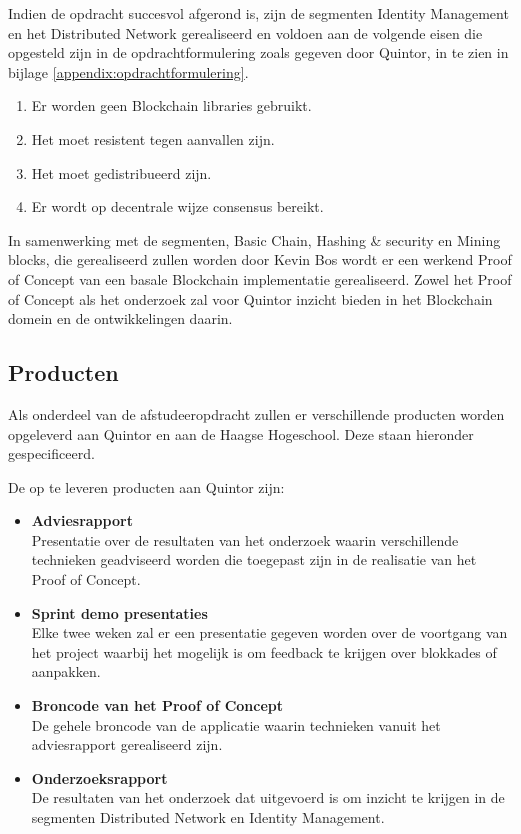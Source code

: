 Indien de opdracht succesvol afgerond is, zijn de segmenten Identity Management en het Distributed Network gerealiseerd en voldoen aan de volgende eisen die opgesteld zijn in de opdrachtformulering zoals gegeven door Quintor, in te zien in bijlage \ref{appendix:opdrachtformulering}.

\begin{enumerate}[noitemsep]
  \item Er worden geen Blockchain libraries gebruikt.
  \item Het moet resistent tegen aanvallen zijn.
  \item Het moet gedistribueerd zijn.
  \item Er wordt op decentrale wijze consensus bereikt.
\end{enumerate}

In samenwerking met de segmenten, Basic Chain, Hashing \& security en Mining blocks, die gerealiseerd zullen worden door Kevin Bos wordt er een werkend Proof of Concept van een basale Blockchain implementatie gerealiseerd. Zowel het Proof of Concept als het onderzoek zal voor Quintor inzicht bieden in het Blockchain domein en de ontwikkelingen daarin.

\subsection{Producten}

Als onderdeel van de afstudeeropdracht zullen er verschillende producten worden opgeleverd aan Quintor en aan de Haagse Hogeschool. Deze staan hieronder gespecificeerd.

De op te leveren producten aan Quintor zijn:
\begin{itemize}
  \item{\textbf{Adviesrapport}}
  \\ Presentatie over de resultaten van het onderzoek waarin verschillende technieken geadviseerd worden die toegepast zijn in de realisatie van het Proof of Concept.
  \item{\textbf{Sprint demo presentaties}}
  \\ Elke twee weken zal er een presentatie gegeven worden over de voortgang van het project waarbij het mogelijk is om feedback te krijgen over blokkades of aanpakken.
  \item{\textbf{Broncode van het Proof of Concept}}
  \\ De gehele broncode van de applicatie waarin technieken vanuit het adviesrapport gerealiseerd zijn.
  \item{\textbf{Onderzoeksrapport}}
  \\ De resultaten van het onderzoek dat uitgevoerd is om inzicht te krijgen in de segmenten Distributed Network en Identity Management.
\end{itemize}

